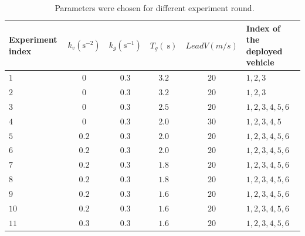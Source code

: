 \documentclass[journal]{IEEEtran}
\begin{document}
\begin{table}
  \centering
  \setlength{\abovecaptionskip}{0pt}
  \setlength{\belowcaptionskip}{10pt}%
  \caption{~Parameters were chosen for different experiment round.}
  {\begin{tabular}{lccccl} \toprule
      Experiment index & $k_{v} (\mathrm{s}^{-2})$ & $k_{g} (\mathrm{s}^{-1})$ & $T_{g} (\mathrm{~s})$ & $LeadV (m/s)$ & Index of the deployed vehicle \\ \midrule
      $1 $             & $0$                       & $0.3 $                    & $3.2$                 & $20$          & $1,2,3$                       \\
      $2 $             & $0$                       & $0.3 $                    & $3.2$                 & $20$          & $1,2,3$                       \\
      $3 $             & $0$                       & $0.3 $                    & $2.5$                 & $20$          & $1,2,3,4,5,6$                 \\
      $4 $             & $0$                       & $0.3 $                    & $2.0$                 & $30$          & $1,2,3,4,5$                   \\
      $5 $             & $0.2$                     & $0.3 $                    & $2.0$                 & $20$          & $1,2,3,4,5,6$                 \\
      $6 $             & $0.2$                     & $0.3 $                    & $2.0$                 & $20$          & $1,2,3,4,5,6$                 \\
      $7 $             & $0.2$                     & $0.3 $                    & $1.8$                 & $20$          & $1,2,3,4,5,6$                 \\
      $8 $             & $0.2$                     & $0.3 $                    & $1.8$                 & $20$          & $1,2,3,4,5,6$                 \\
      $9 $             & $0.2$                     & $0.3 $                    & $1.6$                 & $20$          & $1,2,3,4,5,6$                 \\
      $10$             & $0.2$                     & $0.3 $                    & $1.6$                 & $20$          & $1,2,3,4,5,6$                 \\
      $11$             & $0.3$                     & $0.3 $                    & $1.6$                 & $20$          & $1,2,3,4,5,6$                 \\

\end{tabular}}
\end{table}
\end{document}

